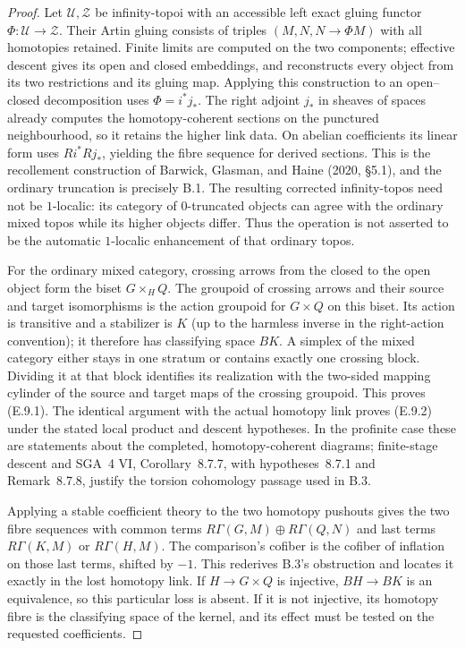 \begin{proof}
Let $\mathcal U,\mathcal Z$ be infinity-topoi with an accessible left exact gluing functor $\Phi:\mathcal U\to\mathcal Z$. Their Artin gluing consists of triples $(M,N,N\to\Phi M)$ with all homotopies retained. Finite limits are computed on the two components; effective descent gives its open and closed embeddings, and reconstructs every object from its two restrictions and its gluing map. Applying this construction to an open--closed decomposition uses $\Phi=i^*j_*$. The right adjoint $j_*$ in sheaves of spaces already computes the homotopy-coherent sections on the punctured neighbourhood, so it retains the higher link data. On abelian coefficients its linear form uses $Ri^*Rj_*$, yielding the fibre sequence for derived sections. This is the recollement construction of Barwick, Glasman, and Haine (2020, \S5.1), and the ordinary truncation is precisely B.1. The resulting corrected infinity-topos need not be $1$-localic: its category of $0$-truncated objects can agree with the ordinary mixed topos while its higher objects differ. Thus the operation is not asserted to be the automatic $1$-localic enhancement of that ordinary topos.

For the ordinary mixed category, crossing arrows from the closed to the open object form the biset $G\times_HQ$. The groupoid of crossing arrows and their source and target isomorphisms is the action groupoid for $G\times Q$ on this biset. Its action is transitive and a stabilizer is $K$ (up to the harmless inverse in the right-action convention); it therefore has classifying space $BK$. A simplex of the mixed category either stays in one stratum or contains exactly one crossing block. Dividing it at that block identifies its realization with the two-sided mapping cylinder of the source and target maps of the crossing groupoid. This proves (E.9.1). The identical argument with the actual homotopy link proves (E.9.2) under the stated local product and descent hypotheses. In the profinite case these are statements about the completed, homotopy-coherent diagrams; finite-stage descent and SGA~4 VI, Corollary~8.7.7, with hypotheses~8.7.1 and Remark~8.7.8, justify the torsion cohomology passage used in B.3.

Applying a stable coefficient theory to the two homotopy pushouts gives the two fibre sequences with common terms $R\Gamma(G,M)\oplus R\Gamma(Q,N)$ and last terms $R\Gamma(K,M)$ or $R\Gamma(H,M)$. The comparison's cofiber is the cofiber of inflation on those last terms, shifted by $-1$. This rederives B.3's obstruction and locates it exactly in the lost homotopy link. If $H\to G\times Q$ is injective, $BH\to BK$ is an equivalence, so this particular loss is absent. If it is not injective, its homotopy fibre is the classifying space of the kernel, and its effect must be tested on the requested coefficients.


\end{proof}
